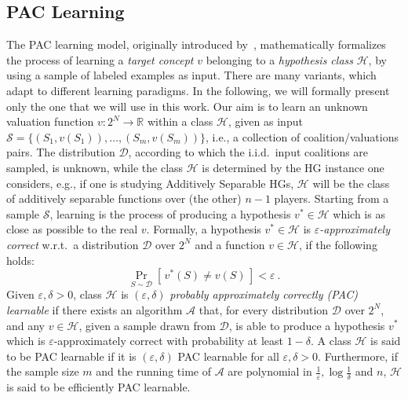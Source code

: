 \documentclass[letterpaper]{article} %
\let\eps\varepsilon
\newcommand{\distribution}{\mathcal{D}}
\newcommand{\Prob}[2]{\Pr_{#2}\left[\,#1\,\right]}
\newcommand{\RR}{\ensuremath{\mathbb{R}}}
\newcommand{\hclass}{\ensuremath{\mathcal{H}}}
\newcommand{\sample}{\ensuremath{\mathcal{S}}}
\begin{document}
\subsection{PAC Learning}
The PAC learning model, originally introduced by~\citet{Valiant84}, mathematically formalizes the process of learning a \emph{target concept} $v$ belonging to a \emph{hypothesis class} $\hclass$, by using a sample of labeled examples as input. There are many variants, which adapt to different learning paradigms. In the following, we will formally present only the one that we will use in this work.
Our aim is to learn an unknown valuation function $v:2^N \rightarrow \RR$ within a class $\hclass$, given as input $\sample = \{( S_1, v(S_1)), \ldots, (S_m, v(S_m))\}$, i.e., a collection of coalition/valuations pairs.
The distribution $\distribution$, according to which the i.i.d.\ input coalitions are sampled, is unknown, while the class $\hclass$ is determined by the HG instance one considers, e.g., if one is studying Additively Separable HGs, $\hclass$ will be the class of additively separable functions over (the other) $n-1$ players.
%
Starting from a sample $\sample$, learning is the process of producing a hypothesis $v^* \in \hclass$ which is as close as possible to the real $v$. 
%
Formally, a hypothesis $v^* \in \hclass$ is \emph{$\eps$-approximately correct} w.r.t.\ a distribution $\distribution$ over $2^N$ and a function $v \in \hclass$, if the following holds:
\begin{equation*}
    \Prob{v^*(S) \neq v(S)}{S\sim \distribution} < \eps \ .
\end{equation*}
Given $\eps, \delta >0$, class $\hclass$ is $(\eps, \delta)$ \emph{probably approximately correctly (PAC) learnable} if there exists an algorithm $\mathcal{A}$ that, for every distribution $\distribution$ over $2^N$, and any $v \in \hclass$, given a sample drawn from $\distribution$, is able to produce a hypothesis $v^*$ which is $\eps$-approximately correct with probability at least $1-\delta$. A class $\hclass$ is said to be PAC learnable if it is $(\eps, \delta)$ PAC learnable for all $\eps, \delta >0$. Furthermore, if the sample size $m$ and the running time of $\mathcal{A}$ are polynomial in $\frac{1}{\eps}, \log{\frac{1}{\delta}}$ and $n$, $\hclass$ is said to be efficiently PAC learnable.
\end{document}
